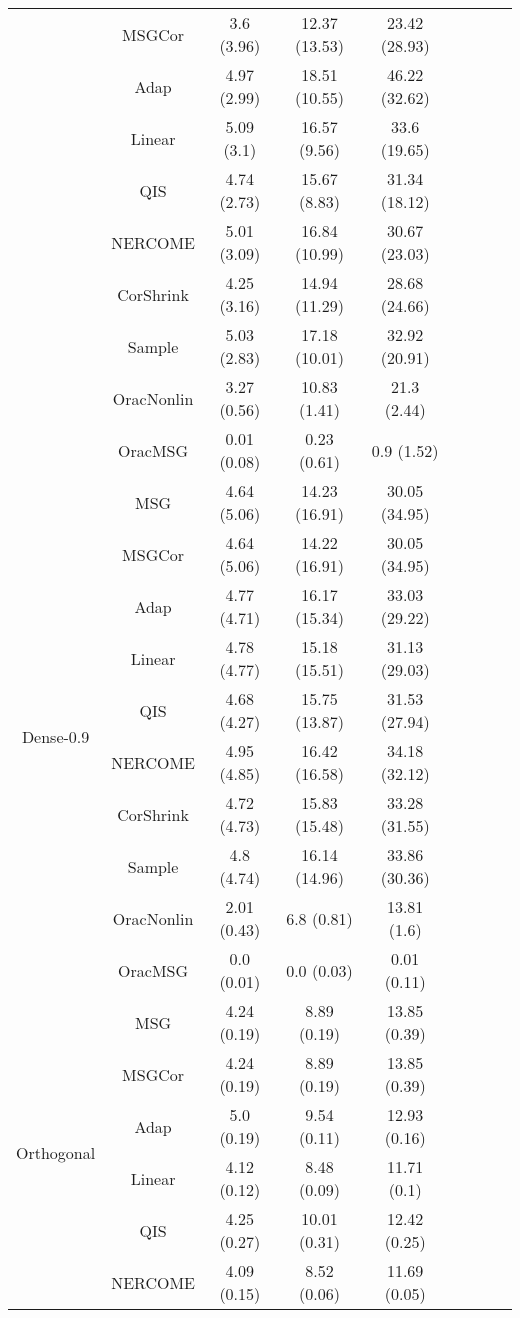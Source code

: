 \documentclass{article}
\begin{document}
\begin{table}[H]
{\begin{tabular}{ccccccccc}
 & MSGCor   & 3.6 (3.96)  & 12.37 (13.53) & 23.42 (28.93) \\
 & Adap     & 4.97 (2.99) & 18.51 (10.55) & 46.22 (32.62) \\
 & Linear         & 5.09 (3.1)  & 16.57 (9.56)  & 33.6 (19.65)  \\
 & QIS            & 4.74 (2.73) & 15.67 (8.83)  & 31.34 (18.12) \\
 & NERCOME        & 5.01 (3.09) & 16.84 (10.99) & 30.67 (23.03) \\
 & CorShrink      & 4.25 (3.16) & 14.94 (11.29) & 28.68 (24.66) \\
 & Sample            & 5.03 (2.83) & 17.18 (10.01) & 32.92 (20.91) \\
 & OracNonlin & 3.27 (0.56) & 10.83 (1.41)  & 21.3 (2.44)   \\
 & OracMSG  & 0.01 (0.08) & 0.23 (0.61)   & 0.9 (1.52)  \\  \midrule
\multirow{10}{*}{Dense-0.9}    
 & MSG & 4.64 (5.06) & 14.23 (16.91) & 30.05 (34.95) \\
 & MSGCor   & 4.64 (5.06) & 14.22 (16.91) & 30.05 (34.95) \\
 & Adap     & 4.77 (4.71) & 16.17 (15.34) & 33.03 (29.22) \\
 & Linear         & 4.78 (4.77) & 15.18 (15.51) & 31.13 (29.03) \\
 & QIS            & 4.68 (4.27)  & 15.75 (13.87) & 31.53 (27.94) \\
 & NERCOME        & 4.95 (4.85) & 16.42 (16.58) & 34.18 (32.12) \\
 & CorShrink      & 4.72 (4.73) & 15.83 (15.48) & 33.28 (31.55) \\
 & Sample            & 4.8 (4.74)  & 16.14 (14.96) & 33.86 (30.36) \\
 & OracNonlin & 2.01 (0.43) & 6.8 (0.81)    & 13.81 (1.6)   \\
 & OracMSG  & 0.0 (0.01)  & 0.0 (0.03)    & 0.01 (0.11) \\ \midrule
\multirow{10}{*}{Orthogonal}  
 & MSG & 4.24 (0.19) & 8.89 (0.19)  & 13.85 (0.39) \\
 & MSGCor   & 4.24 (0.19) & 8.89 (0.19)  & 13.85 (0.39) \\
 & Adap     & 5.0 (0.19)  & 9.54 (0.11)  & 12.93 (0.16) \\
 & Linear         & 4.12 (0.12) & 8.48 (0.09)  & 11.71 (0.1)  \\
 & QIS            & 4.25 (0.27)  & 10.01 (0.31) & 12.42 (0.25) \\
 & NERCOME        & 4.09 (0.15) & 8.52 (0.06)  & 11.69 (0.05) \\

\end{tabular}}
\end{table}
\end{document}
